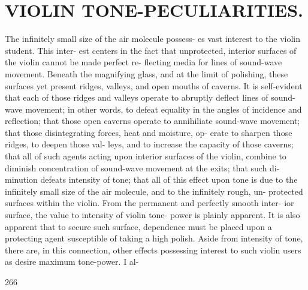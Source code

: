 \documentclass{article}
\begin{document}
\section*{VIOLIN TONE-PECULIARITIES.}
The infinitely small size of the air molecule possess- es vast interest to the violin student. This inter- est centers in the fact that unprotected, interior surfaces of the violin cannot be made perfect re- flecting media for lines of sound-wave movement. Beneath the magnifying glass, and at the limit of polishing, these surfaces yet present ridges, valleys, and open mouths of caverns. It is self-evident that each of those ridges and valleys operate to abruptly deflect lines of sound-wave movement; in other words, to defeat equality in the angles of incidence and reflection; that those open caverns operate to annihiliate sound-wave movement; that those disintegrating forces, heat and moisture, op- erate to sharpen those ridges, to deepen those val- leys, and to increase the capacity of those caverns; that all of such agents acting upon interior surfaces of the violin, combine to diminish concentration of sound-wave movement at the exits; that such di- minution defeats intensity of tone; that all of this effect upon tone is due to the infinitely small size of the air molecule, and to the infinitely rough, un- protected surfaces within the violin. From the permanent and perfectly smooth inter- ior surface, the value to intensity of violin tone- power is plainly apparent. It is also apparent that to secure such surface, dependence must be placed upon a protecting agent susceptible of taking a high polish. Aside from intensity of tone, there are, in this connection, other effects possessing interest to such violin users as desire maximum tone-power. I al-

266
\end{document}
